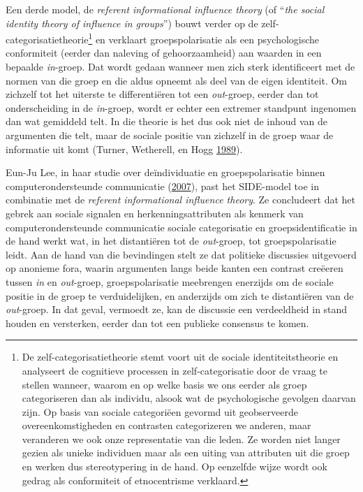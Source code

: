\documentclass[10.5pt,dutch,]{article}
\begin{document}
Een derde model, de \emph{referent informational influence theory} (of
``\emph{the social identity theory of influence in groups}'') bouwt
verder op de zelf-categorisatietheorie\footnote{De
  zelf-categorisatietheorie stemt voort uit de sociale
  identiteitstheorie en analyseert de cognitieve processen in
  zelf-categorisatie door de vraag te stellen wanneer, waarom en op
  welke basis we ons eerder als groep categoriseren dan als individu,
  alsook wat de psychologische gevolgen daarvan zijn. Op basis van
  sociale categoriëen gevormd uit geobserveerde overeenkomstigheden en
  contrasten categorizeren we anderen, maar veranderen we ook onze
  representatie van die leden. Ze worden niet langer gezien als unieke
  individuen maar als een uiting van attributen uit die groep en werken
  dus stereotypering in de hand. Op eenzelfde wijze wordt ook gedrag als
  conformiteit of etnocentrisme verklaard.} en verklaart
groepspolarisatie als een psychologische conformiteit (eerder dan
naleving of gehoorzaamheid) aan waarden in een bepaalde \emph{in}-groep.
Dat wordt gedaan wanneer men zich sterk identificeert met de normen van
die groep en die aldus opneemt als deel van de eigen identiteit. Om
zichzelf tot het uiterste te differentiëren tot een \emph{out}-groep,
eerder dan tot onderscheiding in de \emph{in}-groep, wordt er echter een
extremer standpunt ingenomen dan wat gemiddeld telt. In die theorie is
het dus ook niet de inhoud van de argumenten die telt, maar de sociale
positie van zichzelf in de groep waar de informatie uit komt (Turner,
Wetherell, en Hogg
\protect\hyperlink{ref-turnerux5freferentux5f1989}{1989}).

Eun-Ju Lee, in haar studie over deïndividuatie en groepspolarisatie
binnen computerondersteunde communicatie
(\protect\hyperlink{ref-leeux5fdeindividuationux5f2007}{2007}), past het
SIDE-model toe in combinatie met de \emph{referent informational
influence theory}. Ze concludeert dat het gebrek aan sociale signalen en
herkenningsattributen als kenmerk van computerondersteunde communicatie
sociale categorisatie en groepsidentificatie in de hand werkt wat, in
het distantiëren tot de \emph{out}-groep, tot groepspolarisatie leidt.
Aan de hand van die bevindingen stelt ze dat politieke discussies
uitgevoerd op anonieme fora, waarin argumenten langs beide kanten een
contrast creëeren tussen \emph{in} en \emph{out}-groep,
groepspolarisatie meebrengen enerzijds om de sociale positie in de groep
te verduidelijken, en anderzijds om zich te distantiëren van de
\emph{out}-groep. In dat geval, vermoedt ze, kan de discussie een
verdeeldheid in stand houden en versterken, eerder dan tot een publieke
consensus te komen.
\end{document}
